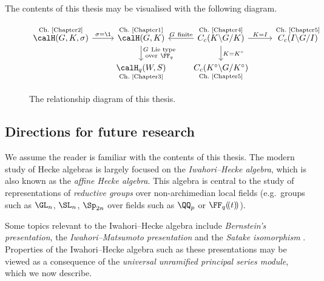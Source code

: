The contents of this thesis may be visualised with the following diagram.
\begin{figure}[H]
	\[
		\begin{tikzcd}
			{\overset{\text{Ch.\ \ref{Chapter2}}}{\calH(G,K,\sigma)}} & {\overset{\text{Ch.\ \ref{Chapter1}}}{\calH(G,K)}} & {\overset{\text{Ch.\ \ref{Chapter4}}}{C_c(K\backslash G/K)}} & {\overset{\text{Ch.\ \ref{Chapter5}}}{C_c(I\backslash G/I)}} \\
			& {\underset{\text{Ch.\ \ref{Chapter3}}}{\calH_q(W,S)}} & {\underset{\text{Ch.\ \ref{Chapter5}}}{C_c(K^\circ\backslash G/K^\circ)}}
			\arrow["{K=K^\circ}", from=1-3, to=2-3]
			\arrow["{G\ \text{finite}}"', from=1-3, to=1-2]
			\arrow["{K=I}", from=1-3, to=1-4]
			\arrow["{\substack{G\ \text{Lie type}\\ \text{over}\ \FF_q}}", from=1-2, to=2-2]
			\arrow["{\sigma=\1}", from=1-1, to=1-2]
		\end{tikzcd}
	\]
	\caption{The relationship diagram of this thesis.}
\end{figure}


\subsection*{Directions for future research}
We assume the reader is familiar with the contents of this thesis.
The modern study of Hecke algebras is largely focused on the \emph{Iwahori--Hecke algebra}, which is also known as the \emph{affine Hecke algebra}.
This algebra is central to the study of representations of \emph{reductive groups} over non-archimedian local fields (e.g.\ groups such as $\GL_n$, $\SL_n$, $\Sp_{2n}$ over fields such as $\QQ_p$ or $\FF_q(\!(t)\!)$).

Some topics relevant to the Iwahori--Hecke algebra include \emph{Bernstein's presentation}, the \emph{Iwahori--Matsumoto presentation} and the \emph{Satake isomorphism} \cite{HKP}.
Properties of the Iwahori--Hecke algebra such as these presentations may be viewed as a consequence of the \emph{universal unramified principal series module}, which we now describe.

